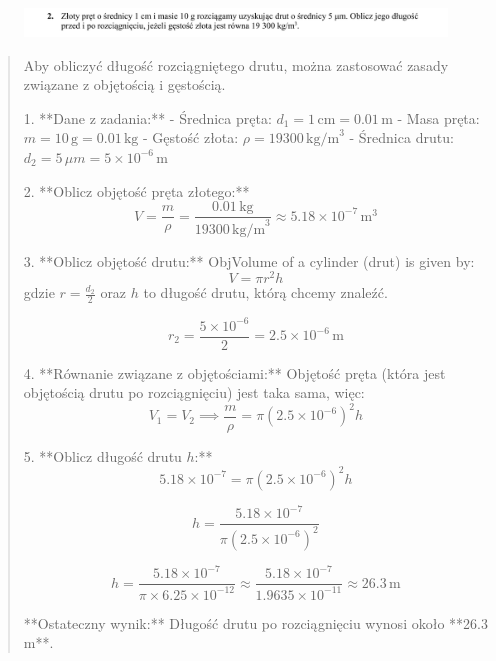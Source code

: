 \documentclass{article}
\begin{document}
    \begin{figure}[h!]
        \centering
        \includegraphics[width=1\textwidth]{Solutions/Zestaw 01/desc_02.png}
    \end{figure}

    \begin{quote}
    Aby obliczyć długość rozciągniętego drutu, można zastosować zasady związane z objętością i gęstością.

1. **Dane z zadania:**
   - Średnica pręta: \(d_1 = 1 \, \text{cm} = 0.01 \, \text{m}\)
   - Masa pręta: \(m = 10 \, \text{g} = 0.01 \, \text{kg}\)
   - Gęstość złota: \(\rho = 19300 \, \text{kg/m}^3\)
   - Średnica drutu: \(d_2 = 5 \, \mu m = 5 \times 10^{-6} \, \text{m}\)

2. **Oblicz objętość pręta złotego:**
   \[
   V = \frac{m}{\rho} = \frac{0.01 \, \text{kg}}{19300 \, \text{kg/m}^3} \approx 5.18 \times 10^{-7} \, \text{m}^3
   \]

3. **Oblicz objętość drutu:**
   ObjVolume of a cylinder (drut) is given by:
   \[
   V = \pi r^2 h
   \]
   gdzie \(r = \frac{d_2}{2}\) oraz \(h\) to długość drutu, którą chcemy znaleźć.

   \[
   r_2 = \frac{5 \times 10^{-6}}{2} = 2.5 \times 10^{-6} \, \text{m}
   \]

4. **Równanie związane z objętościami:**
   Objętość pręta (która jest objętością drutu po rozciągnięciu) jest taka sama, więc:
   \[
   V_1 = V_2 \implies \frac{m}{\rho} = \pi (2.5 \times 10^{-6})^2 h
   \]

5. **Oblicz długość drutu \(h\):**
   \[
   5.18 \times 10^{-7} = \pi (2.5 \times 10^{-6})^2 h
   \]

   \[
   h = \frac{5.18 \times 10^{-7}}{\pi (2.5 \times 10^{-6})^2}
   \]

   \[
   h = \frac{5.18 \times 10^{-7}}{\pi \times 6.25 \times 10^{-12}} \approx \frac{5.18 \times 10^{-7}}{1.9635 \times 10^{-11}} \approx 26.3 \, \text{m}
   \]

**Ostateczny wynik:** Długość drutu po rozciągnięciu wynosi około **26.3 m**.
    \end{quote}
    
\end{document}
